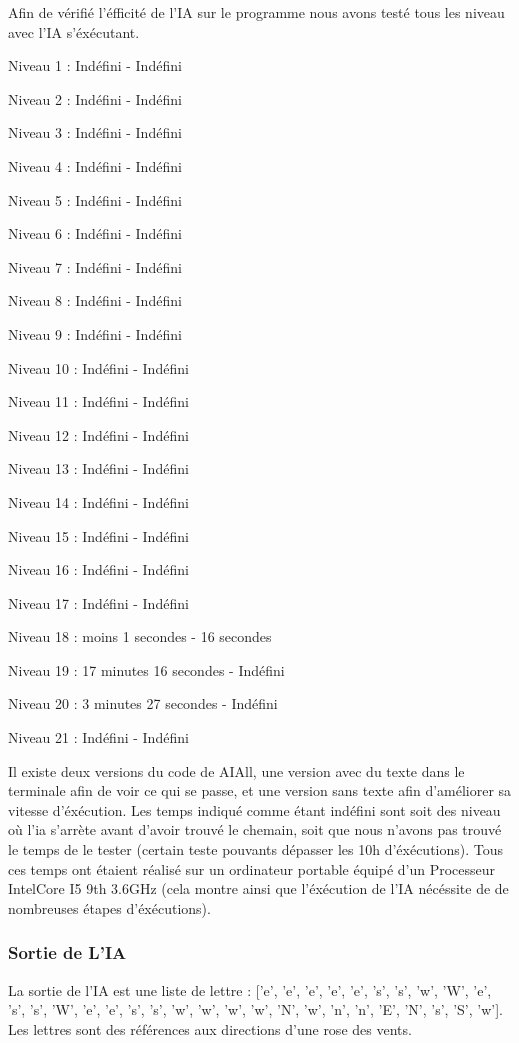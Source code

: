 \documentclass[a4paper,12pt]{article} %
\begin{document}
Afin de vérifié l'éfficité de l'IA sur le programme nous avons testé tous les niveau avec l'IA s'éxécutant.

Niveau 1 : Indéfini - Indéfini

Niveau 2 : Indéfini - Indéfini

Niveau 3 : Indéfini - Indéfini

Niveau 4 : Indéfini - Indéfini

Niveau 5 : Indéfini - Indéfini

Niveau 6 : Indéfini - Indéfini

Niveau 7 : Indéfini - Indéfini

Niveau 8 : Indéfini - Indéfini

Niveau 9 : Indéfini - Indéfini

Niveau 10 : Indéfini - Indéfini

Niveau 11 : Indéfini - Indéfini

Niveau 12 : Indéfini - Indéfini

Niveau 13 : Indéfini - Indéfini

Niveau 14 : Indéfini - Indéfini

Niveau 15 : Indéfini - Indéfini

Niveau 16 : Indéfini - Indéfini

Niveau 17 : Indéfini - Indéfini

Niveau 18 : moins 1 secondes - 16 secondes

Niveau 19 : 17 minutes 16 secondes - Indéfini

Niveau 20 : 3 minutes 27 secondes - Indéfini

Niveau 21 : Indéfini - Indéfini

Il existe deux versions du code de AIAll, une version avec du texte dans le terminale afin de voir ce qui se passe, et une version sans texte afin d'améliorer sa vitesse d'éxécution.
Les temps indiqué comme étant indéfini sont soit des niveau où l'ia s'arrète avant d'avoir trouvé le chemain, soit que nous n'avons pas trouvé le temps de le tester (certain teste pouvants dépasser les 10h d'éxécutions).
Tous ces temps ont étaient réalisé sur un ordinateur portable équipé d'un Processeur IntelCore I5 9th 3.6GHz (cela montre ainsi que l'éxécution de l'IA nécéssite de de nombreuses étapes d'éxécutions).

\subsubsection{Sortie de L'IA}

La sortie de l'IA est une liste de lettre : ['e', 'e', 'e', 'e', 'e', 's', 's', 'w', 'W', 'e', 's', 's', 'W', 'e', 'e', 's', 's', 'w', 'w', 'w', 'w', 'N', 'w', 'n', 'n', 'E', 'N', 's', 'S', 'w'].
Les lettres sont des références aux directions d'une rose des vents.
\end{document}
